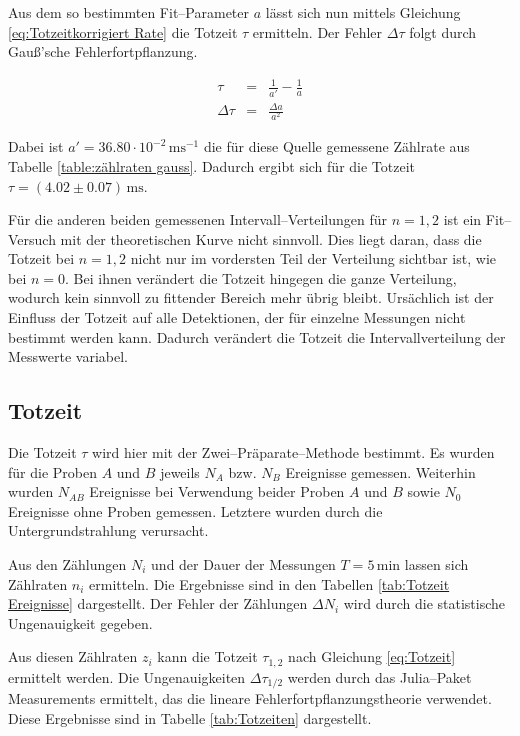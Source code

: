 \documentclass[12pt,a4paper]{scrartcl}
\numberwithin{equation}{section} %
\newcommand{\code}[1]{\textsf{#1}}
\begin{document}
Aus dem so bestimmten Fit--Parameter $a$ lässt sich nun mittels Gleichung \eqref{eq:Totzeitkorrigiert Rate} die Totzeit $\tau$ ermitteln. Der Fehler $\Delta \tau$ folgt durch Gauß'sche Fehlerfortpflanzung.

\begin{eqnarray}
	\tau &=& \frac{1}{a'} - \frac{1}{a} \\
	\Delta \tau &=& \frac{\Delta a}{a^2}
\end{eqnarray}

\noindent
Dabei ist $a' = 36.80 \cdot 10^{-2} \mathrm{\,ms^{-1}}$ die für diese Quelle gemessene Zählrate aus Tabelle \ref{table:zählraten gauss}. Dadurch ergibt sich für die Totzeit $\tau = (4.02 \pm 0.07) \mathrm{\, ms}$.

Für die anderen beiden gemessenen Intervall--Verteilungen für $n = 1,2$ ist ein Fit--Versuch mit der theoretischen Kurve nicht sinnvoll. Dies liegt daran, dass die Totzeit bei $n = 1,2$ nicht nur im vordersten Teil der Verteilung sichtbar ist, wie bei $n = 0$. Bei ihnen verändert die Totzeit hingegen die ganze Verteilung, wodurch kein sinnvoll zu fittender Bereich mehr übrig bleibt. Ursächlich ist der Einfluss der Totzeit auf alle Detektionen, der für einzelne Messungen nicht bestimmt werden kann. Dadurch verändert die Totzeit die Intervallverteilung der Messwerte variabel.

\hypertarget{Totzeit bestimmen}{\subsection{Totzeit}\label{Totzeit bestimmen}}
Die Totzeit $\tau$ wird hier mit der Zwei--Präparate--Methode bestimmt. Es wurden für die Proben $A$ und $B$ jeweils $N_A$ bzw. $N_B$ Ereignisse gemessen. Weiterhin wurden $N_{AB}$ Ereignisse bei Verwendung beider Proben $A$ und $B$ sowie $N_0$ Ereignisse ohne Proben gemessen. Letztere wurden durch die Untergrundstrahlung verursacht.

Aus den Zählungen $N_i$ und der Dauer der Messungen $T=5\mathrm{\,min}$ lassen sich Zählraten $n_i$ ermitteln. Die Ergebnisse sind in den Tabellen \ref{tab:Totzeit Ereignisse} dargestellt. Der Fehler der Zählungen $\Delta N_i$ wird durch die statistische Ungenauigkeit gegeben.

Aus diesen Zählraten $z_i$ kann die Totzeit $\tau_{1,2}$ nach Gleichung \eqref{eq:Totzeit} ermittelt werden. Die Ungenauigkeiten $\Delta \tau_{1/2}$ werden durch das \code{Julia}--Paket \code{Measurements} ermittelt, das die lineare Fehlerfortpflanzungstheorie verwendet. \cite{Julia:Measurements} Diese Ergebnisse sind in Tabelle \ref{tab:Totzeiten} dargestellt.
\end{document}
